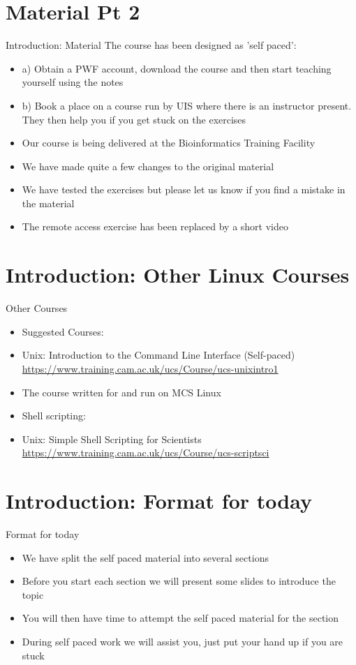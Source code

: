 \section{Material Pt 2}
\begin{frame}{Introduction: Material}
The course has been designed as 'self paced':
\begin{itemize}
\item a) Obtain a PWF account, download the course and then start teaching yourself using the notes
\item b) Book a place on a course run by UIS where there is an instructor present. They then help you if you get stuck on the exercises
\item Our course is being delivered at the Bioinformatics Training Facility
\item We have made quite a few changes to the original material
\item We have tested the exercises but please let us know if you find a mistake in the material 
\item The remote access exercise has been replaced by a short video
\end{itemize}
\end{frame}

\section{Introduction: Other Linux Courses}
\begin{frame}{Other Courses}
\begin{itemize}
\item{Suggested Courses:}
\item Unix: Introduction to the Command Line Interface (Self-paced)
\small {\url{https://www.training.cam.ac.uk/ucs/Course/ucs-unixintro1}} 
\item{The course written for and run on MCS Linux}
\pause
\item Shell scripting:
\item Unix: Simple Shell Scripting for Scientists
\small {\url{https://www.training.cam.ac.uk/ucs/Course/ucs-scriptsci}} 
\end{itemize}
\end{frame}

\section{Introduction: Format for today}
\begin{frame}{Format for today}
\begin{itemize}
\item We have split the self paced material into several sections
\item Before you start each section we will present some slides to introduce the topic
\item You will then have time to attempt the self paced material for the section
\item During self paced work we will assist you, just put your hand up if you are stuck
\end{itemize}
\end{frame}

